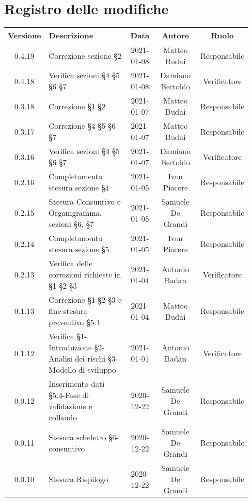 \section*{Registro delle modifiche}

\begin{center}
	\begin{longtable}{|c|p{5cm}|c|c|c|}
	\hline
	\rowcolor{lighter-grayer}
	\textbf{Versione} & \textbf{Descrizione} & \textbf{Data} & \textbf{Autore} & \textbf{Ruolo} \\
	\hline
	\endfirsthead

	0.4.19 & Correzione sezione §2 & 2021-01-08 & Matteo Budai & Responsabile \\
	\hline
	0.4.18 & Verifica sezioni §4 §5 §6 §7 & 2021-01-08 & Damiano Bertoldo & Verificatore \\
	\hline
	0.3.18 & Correzione §1 §2 & 2021-01-07 & Matteo Budai & Responsabile \\
	\hline
	0.3.17 & Correzione §4 §5 §6 §7 & 2021-01-07 & Matteo Budai & Responsabile \\
	\hline
	0.3.16 & Verifica sezioni §4 §5 §6 §7 & 2021-01-07 & Damiano Bertoldo & Verificatore \\
	\hline
	0.2.16 & Completamento stesura sezione §4 & 2021-01-05 & Ivan Piacere & Responsabile \\
	\hline
	0.2.15 & Stesura Consuntivo e Organigramma, sezioni §6, §7 & 2021-01-05 & Samuele De Grandi & Responsabile \\
	\hline
	0.2.14 & Completamento stesura sezione §5 & 2021-01-05 & Ivan Piacere & Responsabile \\
	\hline
	0.2.13 & Verifica delle correzioni richieste in §1-§2-§3 & 2021-01-04 & Antonio Badan & Verificatore \\
	\hline
	0.1.13 & Correzione §1-§2-§3 e fine stesura preventivo §5.1 & 2021-01-04 & Matteo Budai & Responsabile \\
	\hline
	0.1.12 & Verifica §1-Introduzione §2-Analisi dei rischi §3-Modello di sviluppo & 2021-01-01 & Antonio Badan & Verificatore \\
	\hline
	0.0.12 & Inserimento dati §5.4-Fase di validazione e collaudo & 2020-12-22 & Samuele De Grandi & Responsabile \\
	\hline
	0.0.11 & Stesura scheletro §6-consuntivo & 2020-12-22 & Samuele De Grandi & Responsabile \\
	\hline
	0.0.10 & Stesura Riepilogo & 2020-12-22 & Samuele De Grandi & Responsabile \\

\end{longtable}
\end{center}
